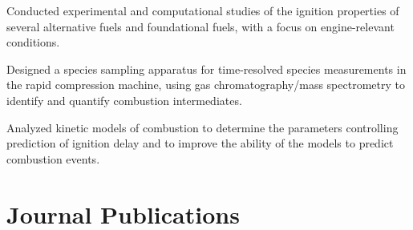 \begin{innerlist}
\item[] Conducted experimental and computational studies of the ignition
properties of several alternative fuels and foundational fuels, with
a focus on engine-relevant conditions.
\item[] Designed a species sampling apparatus for time-resolved
species measurements in the rapid compression machine, using gas
chromatography/mass spectrometry to identify and quantify
combustion intermediates.
\item[] Analyzed kinetic models of combustion to determine the parameters
controlling prediction of ignition delay and to improve the ability of
the models to predict combustion events.
\end{innerlist}

\section{{\sectionfont Journal Publications}}

